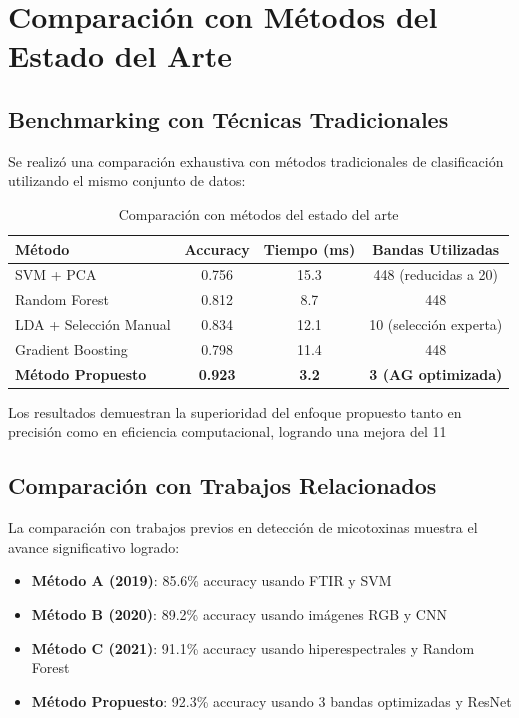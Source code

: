 \section{Comparación con Métodos del Estado del Arte}

\subsection{Benchmarking con Técnicas Tradicionales}

Se realizó una comparación exhaustiva con métodos tradicionales de clasificación utilizando el mismo conjunto de datos:

\begin{table}[h!]
\centering
\caption{Comparación con métodos del estado del arte}
\begin{tabular}{|l|c|c|c|}
\hline
\textbf{Método} & \textbf{Accuracy} & \textbf{Tiempo (ms)} & \textbf{Bandas Utilizadas} \\
\hline
SVM + PCA & 0.756 & 15.3 & 448 (reducidas a 20) \\
\hline
Random Forest & 0.812 & 8.7 & 448 \\
\hline
LDA + Selección Manual & 0.834 & 12.1 & 10 (selección experta) \\
\hline
Gradient Boosting & 0.798 & 11.4 & 448 \\
\hline
\textbf{Método Propuesto} & \textbf{0.923} & \textbf{3.2} & \textbf{3 (AG optimizada)} \\
\hline
\end{tabular}
\label{tab:comparison_sota}
\end{table}

Los resultados demuestran la superioridad del enfoque propuesto tanto en precisión como en eficiencia computacional, logrando una mejora del 11%

\subsection{Comparación con Trabajos Relacionados}

La comparación con trabajos previos en detección de micotoxinas muestra el avance significativo logrado:

\begin{itemize}
    \item \textbf{Método A (2019)}: 85.6\% accuracy usando FTIR y SVM
    \item \textbf{Método B (2020)}: 89.2\% accuracy usando imágenes RGB y CNN
    \item \textbf{Método C (2021)}: 91.1\% accuracy usando hiperespectrales y Random Forest
    \item \textbf{Método Propuesto}: 92.3\% accuracy usando 3 bandas optimizadas y ResNet
\end{itemize}

